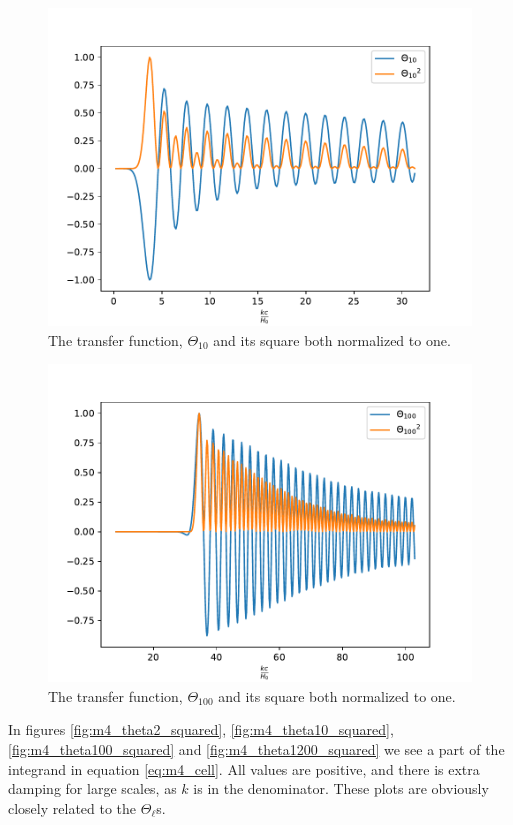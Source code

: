 \documentclass{aa}
\begin{document}
\begin{figure}[h!]
   \includegraphics[scale=0.6]{../figures/milestone4/comparison1.pdf}
   \caption{The transfer function, $\Theta_{10}$ and its square both normalized to one.}\label{fig:m4_comparison1}
\end{figure}

\begin{figure}[h!]
   \includegraphics[scale=0.6]{../figures/milestone4/comparison2.pdf}
   \caption{The transfer function, $\Theta_{100}$ and its square both normalized to one.}\label{fig:m4_comparison2}
\end{figure}


In figures \ref{fig:m4_theta2_squared}, \ref{fig:m4_theta10_squared}, \ref{fig:m4_theta100_squared} and \ref{fig:m4_theta1200_squared} we see a part of the integrand
in equation \ref{eq:m4_cell}. All values are positive, and there is extra damping for large scales, as $k$ is in the denominator. These plots are obviously closely related to the $\Theta_\ell$s. 
\end{document}
